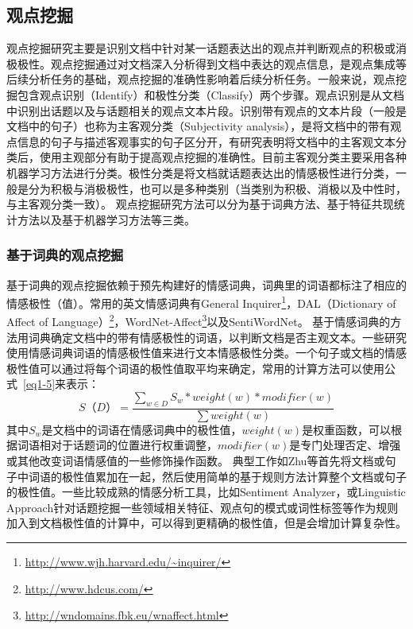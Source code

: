 \subsection{观点挖掘}
\label{ch_mining}
观点挖掘研究主要是识别文档中针对某一话题表达出的观点并判断观点的积极或消极极性。观点挖掘通过对文档深入分析得到文档中表达的观点信息，是观点集成等后续分析任务的基础，观点挖掘的准确性影响着后续分析任务。一般来说，观点挖掘包含观点识别（Identify）和极性分类（Classify）两个步骤。观点识别是从文档中识别出话题以及与话题相关的观点文本片段。识别带有观点的文本片段（一般是文档中的句子）也称为主客观分类（Subjectivity analysis），是将文档中的带有观点信息的句子与描述客观事实的句子区分开，有研究表明将文档中的主客观文本分类后，使用主观部分有助于提高观点挖掘的准确性。目前主客观分类主要采用各种机器学习方法进行分类。极性分类是将文档就话题表达出的情感极性进行分类，一般是分为积极与消极极性，也可以是多种类别（当类别为积极、消极以及中性时，与主客观分类一致）。
观点挖掘研究方法可以分为基于词典方法、基于特征共现统计方法以及基于机器学习方法等三类。

\subsubsection{基于词典的观点挖掘}
基于词典的观点挖掘依赖于预先构建好的情感词典，词典里的词语都标注了相应的情感极性（值）。常用的英文情感词典有General Inquirer\footnote{\url{http://www.wjh.harvard.edu/~inquirer/}}，DAL（Dictionary of Affect of Language）\footnote{\url{http://www.hdcus.com/}}，WordNet-Affect\footnote{\url{http://wndomains.fbk.eu/wnaffect.html}}以及SentiWordNet。
基于情感词典的方法用词典确定文档中的带有情感极性的词语，以判断文档是否主观文本。一些研究使用情感词典词语的情感极性值来进行文本情感极性分类。一个句子或文档的情感极性值可以通过将每个词语的极性值取平均来确定，常用的计算方法可以使用公式~\ref{eq1-5}来表示：
\begin{equation}
\label{eq1-5}
S（D）=\dfrac{\sum_{w \in D}S_w \ast weight(w) \ast modifier(w)}{\sum weight(w)}
\end{equation}
其中$ S_w $是文档中的词语在情感词典中的极性值，$ weight(w) $是权重函数，可以根据词语相对于话题词的位置进行权重调整，$ modifier(w) $是专门处理否定、增强或其他改变词语情感值的一些修饰操作函数。
典型工作如Zhu等首先将文档或句子中词语的极性值累加在一起，然后使用简单的基于规则方法计算整个文档或句子的极性值。一些比较成熟的情感分析工具，比如Sentiment Analyzer，或Linguistic Approach针对话题挖掘一些领域相关特征、观点句的模式或词性标签等作为规则加入到文档极性值的计算中，可以得到更精确的极性值，但是会增加计算复杂性。

